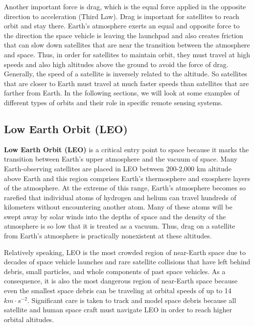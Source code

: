\documentclass[
]{book}
\begin{document}
Another important force is drag, which is the equal force applied in the opposite direction to acceleration (Third Law). Drag is important for satellites to reach orbit and stay there. Earth's atmosphere exerts an equal and opposite force to the direction the space vehicle is leaving the launchpad and also creates friction that can slow down satellites that are near the transition between the atmosphere and space. Thus, in order for satellites to maintain orbit, they must travel at high speeds and also high altitudes above the ground to avoid the force of drag. Generally, the speed of a satellite is inversely related to the altitude. So satellites that are closer to Earth must travel at much faster speeds than satellites that are farther from Earth. In the following sections, we will look at some examples of different types of orbits and their role in specific remote sensing systems.

\subsection{Low Earth Orbit (LEO)}\label{low-earth-orbit-leo}

\textbf{Low Earth Orbit (LEO)} is a critical entry point to space because it marks the transition between Earth's upper atmosphere and the vacuum of space. Many Earth-observing satellites are placed in LEO between 200-2,000 km altitude above Earth and this region comprises Earth's thermosphere and exosphere layers of the atmosphere. At the extreme of this range, Earth's atmosphere becomes so rarefied that individual atoms of hydrogen and helium can travel hundreds of kilometers without encountering another atom. Many of these atoms will be swept away by solar winds into the depths of space and the density of the atmosphere is so low that it is treated as a vacuum. Thus, drag on a satellite from Earth's atmosphere is practically nonexistent at these altitudes.

Relatively speaking, LEO is the most crowded region of near-Earth space due to decades of space vehicle launches and rare satellite collisions that have left behind debris, small particles, and whole components of past space vehicles. As a consequence, it is also the most dangerous region of near-Earth space because even the smallest space debris can be traveling at orbital speeds of up to 14 \(km·s^{-2}\). Significant care is taken to track and model space debris because all satellite and human space craft must navigate LEO in order to reach higher orbital altitudes.
\end{document}
